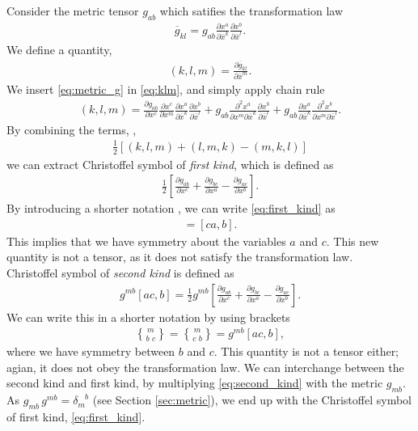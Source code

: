 \documentclass[main.tex]{subfiles}
\begin{document}
Consider the metric tensor $g_{ab}$ which satifies the transformation law
\begin{align} \label{eq:metric_g}
\overline{g}_{kl} = g_{ab} \frac{\partial x^a}{\partial \bar{x}^k}\frac{\partial x^b}{\partial \bar{x}^l}.
\end{align}
We define a quantity,
\begin{align} \label{eq:klm}
(k,l,m) = \frac{\partial \overline{g}_{kl}}{\partial \bar{x}^m}.
\end{align}
We insert \eqref{eq:metric_g} in \eqref{eq:klm}, and simply apply chain rule
\begin{align*}
(k,l,m) =   \frac{\partial g_{ab}}{\partial x^c} \frac{\partial x^c}{\partial x^m} 
	        \frac{\partial x^a}{\partial \bar{x}^k}\frac{\partial x^b}{\partial \bar{x}^l} + 
		g_{ab}\frac{\partial^2 x^a}{\partial x^m \partial \bar{x}^k}
	        \frac{\partial x^b}{\partial \bar{x}^l} +
		g_{ab}\frac{\partial x^a}{\partial \bar{x}^k}
	        \frac{\partial^2 x^b}{\partial x^m \partial \bar{x}^l}.
\end{align*}
By combining the terms, \cite{Hei01},
\begin{align*}
\frac{1}{2} \left[(k,l,m) + (l,m,k) - (m,k,l)\right]
\end{align*}
we can extract Christoffel symbol of \emph{first kind}, which is defined as
\begin{align} \label{eq:first_kind}
\frac{1}{2} \left[\frac{\partial g_{ab}}{\partial x^c} + \frac{\partial g_{bc}}{\partial x^a} -
                        \frac{\partial g_{ac}}{\partial x^b}\right].
\end{align}
By introducing a shorter notation \cite{Hei01}, we can write \eqref{eq:first_kind} as
\begin{align*}
[ac, b] = [ca,b].
\end{align*}
This implies that we have symmetry about the variables $a$ and $c$. 
This new quantity is not a tensor, as it does not satisfy the transformation law.
\\

Christoffel symbol of \emph{second kind} is defined as 
\begin{align*}
 g^{mb} \left[ac,b\right] = \frac{1}{2} g^{mb} \left[\frac{\partial g_{ab}}{\partial x^c} + 
								   \frac{\partial g_{bc}}{\partial x^a} -
                        					   \frac{\partial g_{ac}}{\partial x^b}\right].
\end{align*}
We can write this in a shorter notation by using brackets
\begin{align} 
\label{eq:second_kind}
{m\brace b\,\,c} = {m\brace c\,\,b} = g^{mb} \left[ac,b\right],
\end{align}
where we have symmetry between $b$ and $c$. This quantity is not a tensor either;
agian, it does not obey the transformation law. We can interchange between the 
second kind and first kind, by multiplying \eqref{eq:second_kind} with the metric 
$g_{mb}$. As $g_{mb}\,g^{mb} = \delta^{\phantom{m}b}_m$ (see Section 
\ref{sec:metric}), we end up with the Christoffel symbol of first kind, \eqref{eq:first_kind}.
\\
\end{document}
